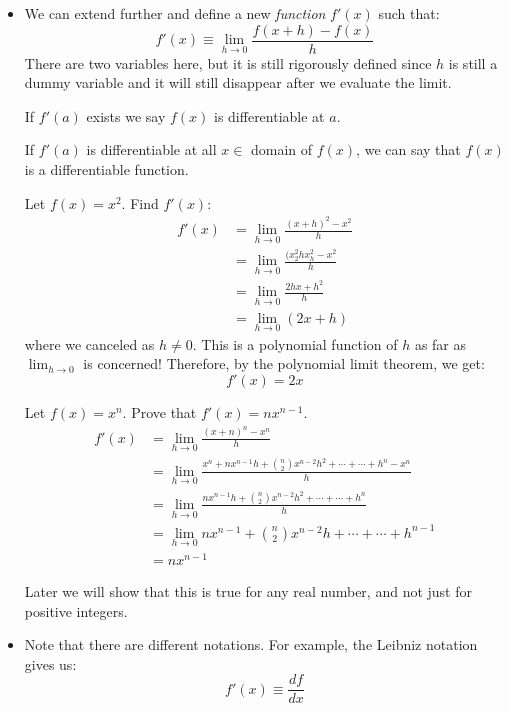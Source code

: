 \begin{itemize}
\begin{equation}
        \label{eq:}
    \end{equation}
    \item We can extend further and define a new \textit{function} $f'(x)$ such that:
    \begin{equation}
        f'(x) \equiv \lim_{h\to 0} \frac{f(x+h)-f(x)}{h}
        \label{eq:}
    \end{equation}
    There are two variables here, but it is still rigorously defined since $h$ is still a dummy variable and it will still disappear after we evaluate the limit.
    \begin{definition}
        If $f'(a)$ exists we say $f(x)$ is differentiable at $a$.
    \end{definition}
    \begin{definition}
        If $f'(a)$ is differentiable at all $x\in $ domain of $f(x)$, we can say that $f(x)$ is a differentiable function.
    \end{definition}
    \begin{example}
        Let $f(x)=x^2$. Find $f'(x)$:
        \begin{align}
            f'(x) &= \lim_{h\to 0} \frac{(x+h)^2-x^2}{h} \\ 
            &= \lim_{h\to 0} \frac{(x^2_2hx_h^2-x^2}{h} \\ 
            &= \lim_{h\to 0} \frac{2hx+h^2}{h} \\ 
            &= \lim_{h\to 0} (2x+h)
        \end{align}
        where we canceled as $h\neq 0$. This is a polynomial function of $h$ as far as $\lim_{h\to 0}$ is concerned! Therefore, by the polynomial limit theorem, we get:
        \begin{equation}
            f'(x) = 2x
            \label{eq:}
        \end{equation}
    \end{example}
    \begin{example}
        Let $f(x)=x^n$. Prove that $f'(x)=nx^{n-1}$.
        \begin{align}
            f'(x) &= \lim_{h\to 0}\frac{(x+n)^n-x^n}{h} \\ 
            &= \lim_{h\to 0} \frac{x^n+nx^{n-1}h+\binom{n}{2}x^{n-2}h^2+\cdots + \cdots + h^n-x^n}{h} \\ 
            &=  \lim_{h\to 0} \frac{nx^{n-1}h+\binom{n}{2}x^{n-2}h^2+\cdots + \cdots + h^n}{h} \\ 
            &= \lim_{h\to 0} nx^{n-1}+\binom{n}{2}x^{n-2}h+\cdots + \cdots + h^{n-1} \\ 
            &= nx^{n-1}
        \end{align}
    \end{example}
    Later we will show that this is true for any real number, and not just for positive integers.
    \item Note that there are different notations. For example, the Leibniz notation gives us:
    \begin{equation}
        f'(x) \equiv \frac{df}{dx}
        \label{eq:}
    \end{equation}
    
\end{itemize}